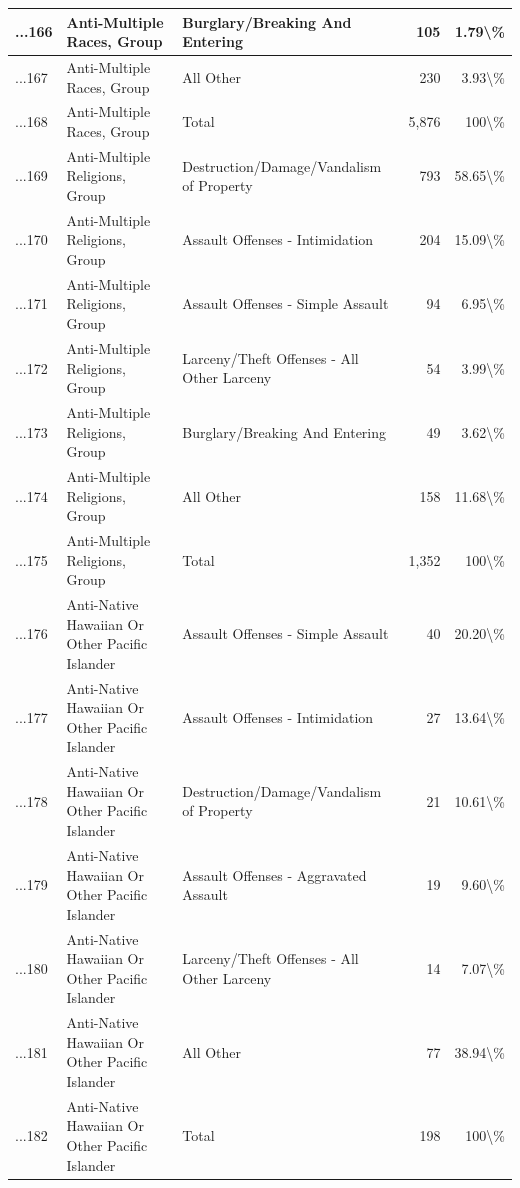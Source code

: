 \documentclass[
]{krantz}
\begin{document}
\begin{longtable}[t]{l|l|l|r|r}
\hline
...166 & Anti-Multiple Races, Group & Burglary/Breaking And Entering & 105 & 1.79\textbackslash{}\%\\
\hline
...167 & Anti-Multiple Races, Group & All Other & 230 & 3.93\textbackslash{}\%\\
\hline
...168 & Anti-Multiple Races, Group & Total & 5,876 & 100\textbackslash{}\%\\
\hline
...169 & Anti-Multiple Religions, Group & Destruction/Damage/Vandalism of Property & 793 & 58.65\textbackslash{}\%\\
\hline
...170 & Anti-Multiple Religions, Group & Assault Offenses - Intimidation & 204 & 15.09\textbackslash{}\%\\
\hline
...171 & Anti-Multiple Religions, Group & Assault Offenses - Simple Assault & 94 & 6.95\textbackslash{}\%\\
\hline
...172 & Anti-Multiple Religions, Group & Larceny/Theft Offenses - All Other Larceny & 54 & 3.99\textbackslash{}\%\\
\hline
...173 & Anti-Multiple Religions, Group & Burglary/Breaking And Entering & 49 & 3.62\textbackslash{}\%\\
\hline
...174 & Anti-Multiple Religions, Group & All Other & 158 & 11.68\textbackslash{}\%\\
\hline
...175 & Anti-Multiple Religions, Group & Total & 1,352 & 100\textbackslash{}\%\\
\hline
...176 & Anti-Native Hawaiian Or Other Pacific Islander & Assault Offenses - Simple Assault & 40 & 20.20\textbackslash{}\%\\
\hline
...177 & Anti-Native Hawaiian Or Other Pacific Islander & Assault Offenses - Intimidation & 27 & 13.64\textbackslash{}\%\\
\hline
...178 & Anti-Native Hawaiian Or Other Pacific Islander & Destruction/Damage/Vandalism of Property & 21 & 10.61\textbackslash{}\%\\
\hline
...179 & Anti-Native Hawaiian Or Other Pacific Islander & Assault Offenses - Aggravated Assault & 19 & 9.60\textbackslash{}\%\\
\hline
...180 & Anti-Native Hawaiian Or Other Pacific Islander & Larceny/Theft Offenses - All Other Larceny & 14 & 7.07\textbackslash{}\%\\
\hline
...181 & Anti-Native Hawaiian Or Other Pacific Islander & All Other & 77 & 38.94\textbackslash{}\%\\
\hline
...182 & Anti-Native Hawaiian Or Other Pacific Islander & Total & 198 & 100\textbackslash{}\%\\

\end{longtable}
\end{document}
